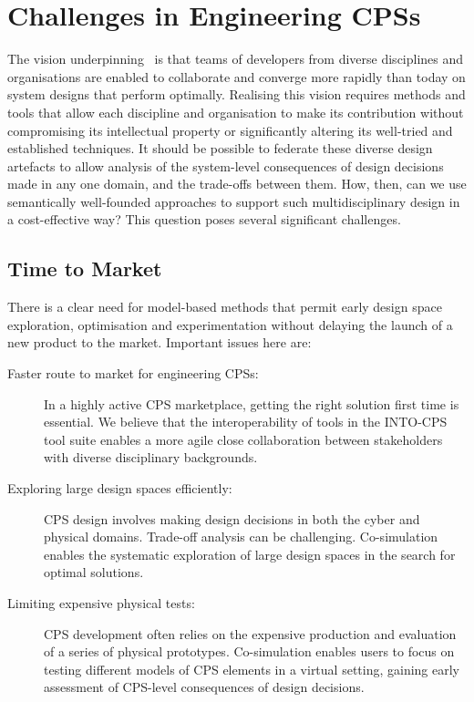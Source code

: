 \section{Challenges in Engineering CPSs}\label{sec:challenges}


The vision underpinning \into\ is that teams of developers from diverse disciplines and organisations are enabled to collaborate and converge more rapidly than today on system designs that perform optimally. Realising this vision requires methods and tools that allow each discipline and organisation to make its contribution without compromising its intellectual property or significantly altering its well-tried and established techniques. It should be possible to federate these diverse design artefacts to allow analy\-sis of the system-level consequences of design decisions made in any one domain, and the trade-offs between them. How, then, can we use semantically well-founded approaches to support such multidisciplinary design in a cost-effective way? This question poses several significant challenges. 

\subsection{Time to Market}

There is a clear need for model-based methods that permit early design space exploration, optimisation and experimentation without delaying the launch of a new product to the market. Important issues here are:

\begin{description}
\item[Faster route to market for engineering CPSs:] In a highly active CPS marketplace, getting the right solution first time is essential. We believe that the interoperability of tools in the INTO-CPS tool suite enables a more agile close collaboration between stakeholders with diverse disciplinary backgrounds.
\item[Exploring large design spaces efficiently:] CPS design involves making design decisions in both the cyber and physical domains. Trade-off analysis can be challenging. Co-simulation enables the systematic exploration of large design spaces in the search for optimal solutions.
\item[Limiting expensive physical tests:] CPS development often relies on the expensive production and evaluation of a series of physical prototypes. Co-simulation enables users to focus on testing different models of CPS elements in a virtual setting, gaining early assessment of CPS-level consequences of design decisions.
\end{description}


